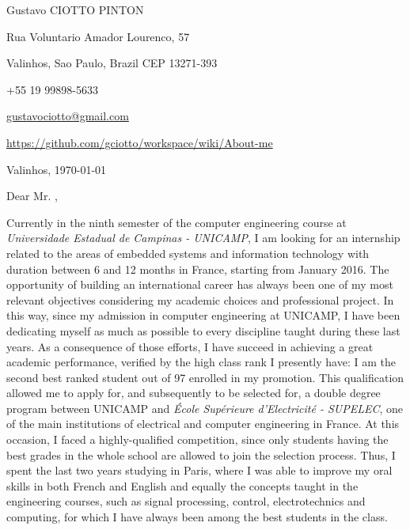 \documentclass[12pt, a4paper]{article}
\begin{document}
\pagestyle{empty} 

Gustavo CIOTTO PINTON

Rua Voluntario Amador Lourenco, 57

Valinhos, Sao Paulo, Brazil CEP 13271-393

+55 19 99898-5633	

\url{gustavociotto@gmail.com}

\url{https://github.com/gciotto/workspace/wiki/About-me}
\begin{flushright}
Valinhos,  \today





\end{flushright}

Dear Mr. , 

\vspace{12pt}
Currently in the ninth semester of the computer engineering course at
\textit{Universidade Estadual de Campinas - UNICAMP}, I am looking for an
internship related to the areas of embedded systems and information technology
with duration between 6 and 12 months in France, starting from January 2016. The opportunity of
building an international career has always been one of my most relevant
objectives considering my academic choices and professional project. In this
way, since my admission in computer engineering at UNICAMP, I have been
dedicating myself as much as possible to every discipline taught during these
last years. As a consequence of those efforts, I have succeed in achieving a
great academic performance, verified by the high class rank I presently have: I am the second
best ranked student out of 97 enrolled in my promotion. This qualification
allowed me to apply for, and subsequently to be selected for, a double degree program
between UNICAMP and \textit{École Supérieure d'Electricité - SUPELEC}, one of
the main institutions of electrical and computer engineering in France. At this
occasion, I faced a highly-qualified competition, since only students
having the best grades in the whole school are allowed to join the selection
process. Thus, I spent the last two years studying in Paris, where I was able to 
improve my oral skills in both French and English and equally the concepts
taught in the engineering courses, such as signal processing, control,
electrotechnics and computing, for which I have always been among the best
students in the class.
\end{document}
